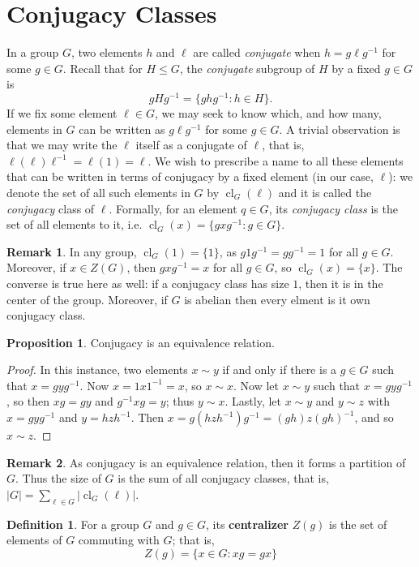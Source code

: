 \documentclass[9pt,reqno]{amsart}
\theoremstyle{definition}
\newtheorem{defi}{Definition}[section]
\newtheorem{rem}{Remark}[section]
\newtheorem{prop}{Proposition}[section]
\DeclareMathOperator{\cl}{cl}
\begin{document}
\section{Conjugacy Classes}
In a group $G$, two elements $h$ and $\ell $ are called \textit{conjugate} when $h = g \ell g^{-1}$ for some $g \in G$. Recall that for $H \leq G$, the \textit{conjugate} subgroup of $H$ by a fixed $g \in G$ is $$gHg^{-1} = \{ ghg^{-1} \colon h \in H \}.$$
If we fix some element $\ell \in G$, we may seek to know which, and how many, elements in $G$ can be written as $g \ell g^{-1}$ for some $g \in G$. A trivial observation is that we may write the  $\ell$ itself as a conjugate of $\ell$, that is, $\ell (\ell) \ell^{-1} = \ell (1) = \ell$. We wish to prescribe a name to all these elements that can be written in terms of conjugacy by a fixed element (in our case, $\ell$): we denote the set of all such elements in $G$ by $\cl_G (\ell)$ and it is called the \textit{conjugacy} class of $\ell$. Formally, for an element $q \in G$, its \textit{conjugacy class} is the set of all elements to it, i.e. $\cl_G(x) = \{ g x g^{-1} \colon g \in G \}$. 
\begin{rem}
In any group, $\cl_G (1) = \{ 1 \}$, as $g 1 g^{-1} = gg^{-1} = 1$ for all $g \in G$. Moreover, if $x \in Z(G)$, then $gxg^{-1} = x$ for all $g \in G$, so $\cl_G (x) = \{ x \}$. The converse is true here as well: if a conjugacy class has size $1$, then it is in the center of the group. Moreover, if $G$ is abelian then every elment is it own conjugacy class. 
\end{rem}
\begin{prop}
Conjugacy is an equivalence relation. 	
\end{prop}
\begin{proof}
	In this instance, two elements $x \sim y$ if and only if there is a $g \in G$ such that $x = gyg^{-1}$. Now $x = 1x1^{-1} = x$, so $x \sim x$. Now let $x \sim y$ such that $x = gyg^{-1}$, so then $xg = gy$ and $g^{-1} x g= y$; thus $y \sim x$. Lastly, let $x \sim y$ and $y \sim z$ with $x = gyg^{-1}$ and $y = hzh^{-1}$. Then  $x = g(hzh^{-1})g^{-1} = (gh)z(gh)^{-1}$, and so $x \sim z$. 
\end{proof}
\begin{rem}
	As conjugacy is an equivalence relation, then it forms a partition of $G$. Thus the size of $G$ is the sum of all conjugacy classes, that is, $|G| = \sum_{\ell \in G} |\cl_G (\ell) |$. 
\end{rem}
\begin{defi}
For a group $G$ and $g \in G$, its \textbf{centralizer} $Z(g)$ is the set of elements of $G$ commuting with $G$; that is, 
$$Z(g) = \{ x \in G \colon xg = gx \}$$	
\end{defi}
\end{document}
